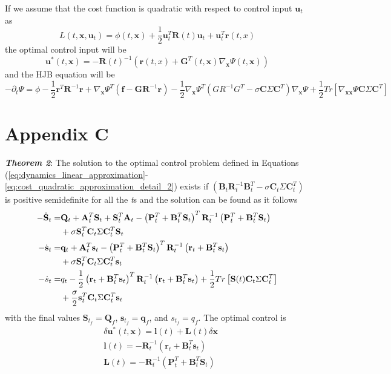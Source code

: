 \documentclass[letterpaper, 10 pt, conference]{ieeeconf}
\newcommand{\vf}{\mathbf f}
\newcommand{\vl}{\mathbf l}
\newcommand{\vq}{\mathbf q}
\newcommand{\vr}{\mathbf r}
\newcommand{\vs}{\mathbf s}
\newcommand{\vu}{\mathbf u}
\newcommand{\vx}{\mathbf x}
\newcommand{\vA}{\mathbf A}
\newcommand{\vB}{\mathbf B}
\newcommand{\vC}{\mathbf C}
\newcommand{\vG}{\mathbf G}
\newcommand{\vL}{\mathbf L}
\newcommand{\vP}{\mathbf P}
\newcommand{\vQ}{\mathbf Q}
\newcommand{\vR}{\mathbf R}
\newcommand{\vS}{\mathbf S}
\begin{document}
If we assume that the cost function is quadratic with respect to control input
$\vu_t$ as
\begin{equation}
L(t,\vx,\vu_t) = \phi(t,\vx) + \frac{1}{2} \vu_t^T \vR(t) \vu_t + \vu_t^T \vr(t,x)
\end{equation}
the optimal control input will be
\begin{equation}
\vu^*(t,\vx) = - \vR(t)^{-1} \left( \vr(t,x) + \vG^T(t,\vx) \nabla_{\vx}\Psi(t,\vx) \right)
\end{equation}
and the HJB equation will be
\begin{equation}
-\partial_t \Psi = \phi -\frac{1}{2}\vr^T \vR^{-1} \vr + \nabla_{\vx}\Psi^T \left( \vf - \vG\vR^{-1}\vr \right) - \frac{1}{2} \nabla_{\vx}\Psi^T \left( GR^{-1}G^T -\sigma \vC\Sigma\vC^T \right) \nabla_{\vx}\Psi + \frac{1}{2} Tr [\nabla_{\vx\vx}\Psi \vC\Sigma\vC^T]
\end{equation}


\section{Appendix C}
\textbf{\textit{Theorem 2}}: 
The solution to the optimal control problem defined in Equations\!
(\ref{eq:dynamics_linear_approximation}-\ref{eq:cost_quadratic_approximation_detail_2}) exists if $\left( \vB_t\vR_t^{-1}\vB_t^T -\sigma \vC_t\Sigma\vC_t^T \right)$ is positive semidefinite for all the \textit{t}s and the solution can be found as it follows
\begin{align}
-\dot{\vS}_t =& \vQ_{t} + \vA_t^T \vS_t + \vS_t^T \vA_t - \left( \vP_t^T + \vB_t^T \vS_t \right)^T \vR_t^{-1} \left( \vP_t^T + \vB_t^T \vS_t \right) \notag \\
 &+ \sigma \vS_t^T \vC_t\Sigma\vC_t^T \vS_t  \label{app_eq:riccati_Sm}\\
-\dot{\vs}_t =& \vq_{t} + \vA_t^T \vs_t - \left( \vP_t^T + \vB_t^T \vS_t \right)^T \vR_t^{-1} \left( \vr_t + \vB_t^T \vs_t \right) \notag \\ 
&+ \sigma  \vS_t^T \vC_t\Sigma\vC_t^T \vs_t \label{app_eq:riccati_Sv}\\
-\dot{s}_t =& q_{t} - \frac{1}{2} \left( \vr_t + \vB_t^T \vs_t \right)^T \vR_t^{-1} \left( \vr_t + \vB_t^T \vs_t \right)  + \frac{1}{2} Tr\left[ \vS(t) \vC_t\Sigma\vC_t^T \right] \notag \\
&+ \frac{\sigma}{2} \vs_t^T \vC_t\Sigma\vC_t^T \vs_t   \label{app_eq:riccati_s}
\end{align}
with the final values $\vS_{t_f} = \vQ_{f}$, $\vs_{t_f} = \vq_{f}$, and $s_{t_f}
= q_{f}$. The optimal control is
\begin{align}
&\delta\vu^*(t,\vx) = \vl(t) + \vL(t) \delta\vx \label{app_eq:optimal_control_update}\\
&\vl(t) = - \vR_t^{-1} \left( \vr_t + \vB_t^T \vs_t \right) \label{app_eq:optimal_control_l}\\
&\vL(t) = - \vR_t^{-1} \left( \vP_t^T + \vB_t^T \vS_t \right) \label{app_eq:optimal_control_L}
\end{align}
\end{document}
